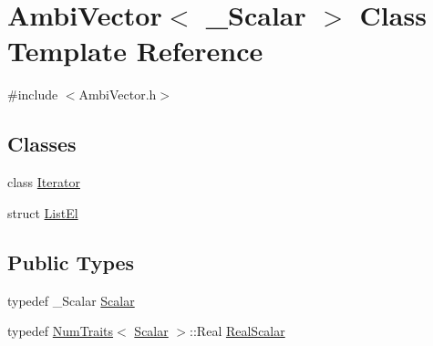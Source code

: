\hypertarget{class_ambi_vector}{\section{Ambi\-Vector$<$ \-\_\-\-Scalar $>$ Class Template Reference}
\label{class_ambi_vector}
}


{\ttfamily \#include $<$Ambi\-Vector.\-h$>$}

\subsection*{Classes}
\begin{DoxyCompactItemize}
\item 
class \hyperlink{class_ambi_vector_1_1_iterator}{Iterator}
\item 
struct \hyperlink{struct_ambi_vector_1_1_list_el}{List\-El}
\end{DoxyCompactItemize}
\subsection*{Public Types}
\begin{DoxyCompactItemize}
\item 
typedef \-\_\-\-Scalar \hyperlink{class_ambi_vector_a08d3ee74ff00bc66d19750bf79989e92}{Scalar}
\item 
typedef \hyperlink{struct_num_traits}{Num\-Traits}$<$ \hyperlink{class_ambi_vector_a08d3ee74ff00bc66d19750bf79989e92}{Scalar} $>$\-::Real \hyperlink{class_ambi_vector_affe86bf272a7fe9dd0e7c8d1945e2648}{Real\-Scalar}
\end{DoxyCompactItemize}
